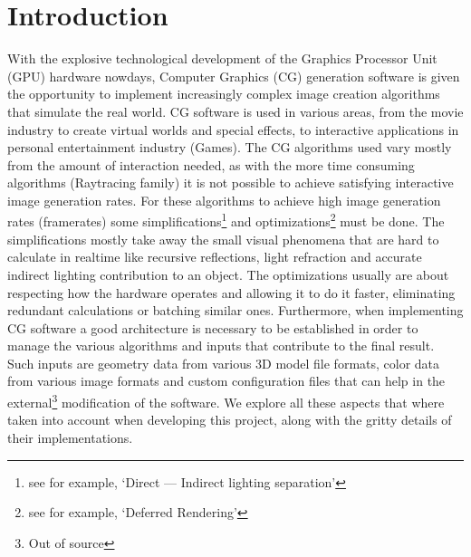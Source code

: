 \section{Introduction}
With the explosive technological development of the Graphics Processor Unit (GPU) hardware nowdays,
Computer Graphics (CG) generation software is given the opportunity to implement increasingly complex image
creation algorithms that simulate the real world. CG software is used in various areas, from the movie
industry to create virtual worlds and special effects, to interactive applications in personal entertainment
industry (Games). The CG algorithms used vary mostly from the amount of interaction needed, as with the more
time consuming algorithms (Raytracing family) it is not possible to achieve satisfying interactive image
generation rates. For these algorithms to achieve high image generation rates (framerates) some
simplifications\footnote{see for example, `Direct --- Indirect lighting separation'} and optimizations\footnote{see
for example, `Deferred Rendering'} must be done. The simplifications mostly take away the small visual phenomena
that are hard to calculate in realtime like recursive reflections, light refraction and accurate indirect lighting
contribution to an object. The optimizations usually are about respecting how the hardware operates and allowing
it to do it faster, eliminating redundant calculations or batching similar ones. Furthermore, when implementing CG
software a good architecture is necessary to be established in order to manage the various algorithms and inputs
that contribute to the final result. Such inputs are geometry data from various 3D model file formats, color data
from various image formats and custom configuration files that can help in the external\footnote{Out of source}
modification of the software. We explore all these aspects that where taken into account when developing this
project, along with the gritty details of their implementations.
